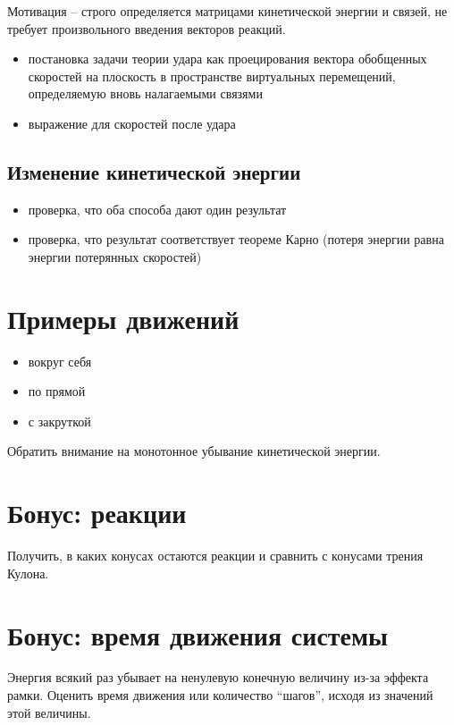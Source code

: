 Мотивация -- строго определяется матрицами кинетической энергии и связей, не требует произвольного введения векторов реакций.

\begin{itemize}
    \item постановка задачи теории удара как проецирования вектора обобщенных скоростей на плоскость в пространстве виртуальных перемещений, определяемую вновь налагаемыми связями
    \item выражение для скоростей после удара
\end{itemize}

\subsection{Изменение кинетической энергии}

\begin{itemize}
    \item проверка, что оба способа дают один результат
    \item проверка, что результат соответствует теореме Карно (потеря энергии равна энергии потерянных скоростей)
\end{itemize}

\section{Примеры движений}

\begin{itemize}
    \item вокруг себя
    \item по прямой
    \item с закруткой
\end{itemize}

Обратить внимание на монотонное убывание кинетической энергии.

\section{Бонус: реакции}

Получить, в каких конусах остаются реакции и сравнить с конусами трения Кулона.

\section{Бонус: время движения системы}

Энергия всякий раз убывает на ненулевую конечную величину из-за эффекта рамки. Оценить время движения или количество ``шагов'', исходя из значений этой величины.



